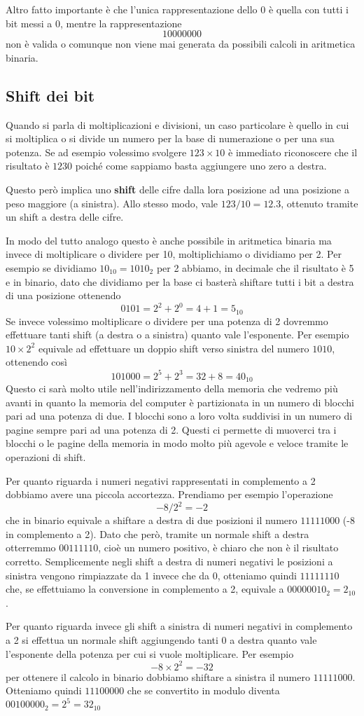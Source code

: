 Altro fatto importante è che l'unica rappresentazione dello 0 è quella con tutti i bit messi a 0,
mentre la rappresentazione
\[ 10000000 \]
non è valida o comunque non viene mai generata da possibili calcoli in aritmetica binaria.

\subsection{Shift dei bit}
Quando si parla di moltiplicazioni e divisioni, un caso particolare è quello in cui si moltiplica
o si divide un numero per la base di numerazione o per una sua potenza. Se ad esempio volessimo
svolgere $123 \times 10$ è immediato riconoscere che il risultato è $1230$ poiché come sappiamo
basta aggiungere uno zero a destra.

Questo però implica uno \textbf{shift} delle cifre dalla lora posizione ad una posizione a peso
maggiore (a sinistra). Allo stesso modo, vale $123 / 10 = 12.3$, ottenuto tramite un shift a destra
delle cifre.

In modo del tutto analogo questo è anche possibile in aritmetica binaria ma invece di moltiplicare
o dividere per 10, moltiplichiamo o dividiamo per 2. Per esempio se dividiamo $10_{10} = 1010_2$
per 2 abbiamo, in decimale che il risultato è 5 e in binario, dato che dividiamo per la base ci
basterà shiftare tutti i bit a destra di una posizione ottenendo
\[ 0101 = 2^2 + 2^0 = 4 + 1 = 5_{10} \]
Se invece volessimo moltiplicare o dividere per una potenza di 2 dovremmo effettuare tanti shift
(a destra o a sinistra) quanto vale l'esponente. Per esempio $10 \times 2^2$ equivale ad effettuare
un doppio shift verso sinistra del numero $1010$, ottenendo così
\[ 101000 = 2^5 + 2^3 = 32 + 8 = 40_{10} \]
Questo ci sarà molto utile nell'indirizzamento della memoria che vedremo più avanti in quanto la
memoria del computer è partizionata in un numero di blocchi pari ad una potenza di due. I blocchi
sono a loro volta suddivisi in un numero di pagine sempre pari ad una potenza di 2. Questi ci
permette di muoverci tra i blocchi o le pagine della memoria in modo molto più agevole e veloce
tramite le operazioni di shift.

Per quanto riguarda i numeri negativi rappresentati in complemento a 2 dobbiamo avere una piccola
accortezza. Prendiamo per esempio l'operazione
\[ -8 / 2^2 = -2 \]
che in binario equivale a shiftare a destra di due posizioni il numero $11111000$ (-8 in
complemento a 2). Dato che però, tramite un normale shift a destra otterremmo $00111110$, cioè un
numero positivo, è chiaro che non è il risultato corretto. Semplicemente negli shift a destra di
numeri negativi le posizioni a sinistra vengono rimpiazzate da 1 invece che da 0, otteniamo quindi
$11111110$ che, se effettuiamo la conversione in complemento a 2, equivale a $00000010_2 = 2_{10}$.

Per quanto riguarda invece gli shift a sinistra di numeri negativi in complemento a 2 si effettua
un normale shift aggiungendo tanti 0 a destra quanto vale l'esponente della potenza per cui si
vuole moltiplicare. Per esempio
\[ -8 \times 2^2 = -32 \]
per ottenere il calcolo in binario dobbiamo shiftare a sinistra il numero $11111000$. Otteniamo
quindi $11100000$ che se convertito in modulo diventa $00100000_2 = 2^5 = 32_{10}$